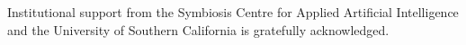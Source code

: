 Institutional support from the Symbiosis Centre for Applied Artificial Intelligence and the University of Southern California is gratefully acknowledged.
